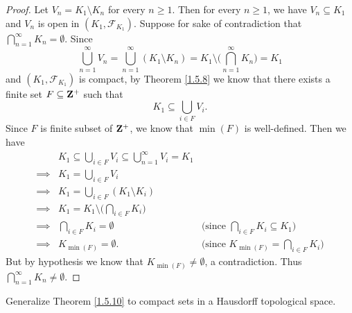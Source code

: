 \begin{proof}
    Let \(V_n = K_1 \setminus K_n\) for every \(n \geq 1\).
    Then for every \(n \geq 1\), we have \(V_n \subseteq K_1\) and \(V_n\) is open in \((K_1, \mathcal{F}_{K_1})\).
    Suppose for sake of contradiction that \(\bigcap_{n = 1}^\infty K_n = \emptyset\).
    Since
    \[
        \bigcup_{n = 1}^\infty V_n = \bigcup_{n = 1}^\infty (K_1 \setminus K_n) = K_1 \setminus \bigg(\bigcap_{n = 1}^\infty K_n\bigg) = K_1
    \]
    and \((K_1, \mathcal{F}_{K_1})\) is compact, by Theorem \ref{1.5.8} we know that there exists a finite set \(F \subseteq \mathbf{Z}^+\) such that
    \[
        K_1 \subseteq \bigcup_{i \in F} V_i.
    \]
    Since \(F\) is finite subset of \(\mathbf{Z}^+\), we know that \(\min(F)\) is well-defined.
    Then we have
    \begin{align*}
                 & K_1 \subseteq \bigcup_{i \in F} V_i \subseteq \bigcup_{n = 1}^\infty V_i = K_1                                                          \\
        \implies & K_1 = \bigcup_{i \in F} V_i                                                                                                             \\
        \implies & K_1 = \bigcup_{i \in F} (K_1 \setminus K_i)                                                                                             \\
        \implies & K_1 = K_1 \setminus \bigg(\bigcap_{i \in F} K_i\bigg)                                                                                   \\
        \implies & \bigcap_{i \in F} K_i = \emptyset                                              & \text{(since \(\bigcap_{i \in F} K_i \subseteq K_1)\)} \\
        \implies & K_{\min(F)} = \emptyset.                                                       & \text{(since \(K_{\min(F)} = \bigcap_{i \in F} K_i)\)}
    \end{align*}
    But by hypothesis we know that \(K_{\min(F)} \neq \emptyset\), a contradiction.
    Thus \(\bigcap_{n = 1}^\infty K_n \neq \emptyset\).
\end{proof}

\begin{exercise}\label{ex 2.5.14}
    Generalize Theorem \ref{1.5.10} to compact sets in a Hausdorff topological space.
\end{exercise}


